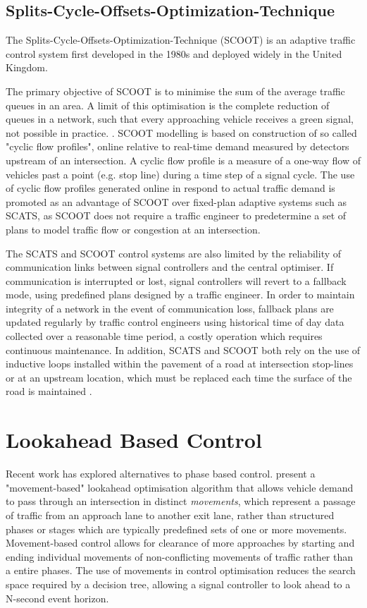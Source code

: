 \subsection{Splits-Cycle-Offsets-Optimization-Technique}

The Splits-Cycle-Offsets-Optimization-Technique (SCOOT) is an adaptive traffic control system first developed in the 1980s and deployed widely in the United Kingdom. %

The primary objective of SCOOT is to minimise the sum of the average traffic queues in an area. A limit of this optimisation is the complete reduction of queues in a network, such that every approaching vehicle receives a green signal, not possible in practice. \cite{bell1992future,robertson1991optimizing}. SCOOT modelling is based on construction of so called "cyclic flow profiles", online relative to real-time demand measured by detectors upstream of an intersection. A cyclic flow profile is a measure of a one-way flow of vehicles past a point (e.g. stop line) during a time step of a signal cycle. The use of cyclic flow profiles generated online in respond to actual traffic demand is promoted as an advantage of SCOOT over fixed-plan adaptive systems such as SCATS, as SCOOT does not require a traffic engineer to predetermine a set of plans to model traffic flow or congestion at an intersection.

The SCATS and SCOOT control systems are also limited by the reliability of communication links between signal controllers and the central optimiser. If communication is interrupted or lost, signal controllers will revert to a fallback mode, using predefined plans designed by a traffic engineer. In order to maintain integrity of a network in the event of communication loss, fallback plans are updated regularly by traffic control engineers using historical time of day data collected over a reasonable time period, a costly operation which requires continuous maintenance. In addition, SCATS and SCOOT both rely on the use of inductive loops installed within the pavement of a road at intersection stop-lines or at an upstream location, which must be replaced each time the surface of the road is maintained  \cite{bell1992future}.

\section{Lookahead Based Control}

Recent work has explored alternatives to phase based control.  present a "movement-based" lookahead optimisation algorithm that allows vehicle demand to pass through an intersection in distinct \emph{movements}, which represent a passage of traffic from an approach lane to another exit lane, rather than structured phases or stages which are typically predefined sets of one or more movements. Movement-based control allows for clearance of more approaches by starting and ending individual movements of non-conflicting movements of traffic rather than a entire phases. The use of movements in control optimisation reduces the search space required by a decision tree, allowing a signal controller to look ahead to a N-second event horizon.

